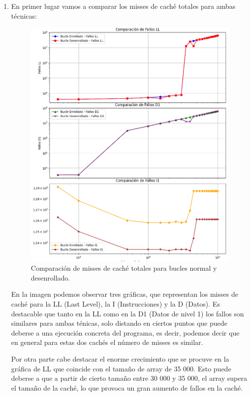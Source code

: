 \documentclass[a4paper,twocolumn]{article}
\begin{document}
\begin{enumerate}
    \item En primer lugar vamos a comparar los misses de caché totales para ambas técnicas:
    \begin{figure}[H]
        \centering
        \includegraphics[width=\columnwidth]{img/numberMisses.png}
        \caption{Comparación de misses de caché totales para bucles normal y desenrollado.}
        \label{fig:real_vs_cpu_time}
    \end{figure}
    
    En la imagen podemos observar tres gráficas, que representan los misses de caché para la LL (Last Level), la I (Instrucciones) y la D (Datos). Es destacable que tanto en la LL como en la D1 (Datos de nivel 1) los fallos son similares para ambas ténicas, solo distando en ciertos puntos que puede deberse a una ejecución concreta del programa, es decir, podemos decir que en general para estas dos cachés el número de misses es similar.

    Por otra parte cabe destacar el enorme crecimiento que se procuve en la gráfica de LL que coincide con el tamaño de array de 35 000. Esto puede deberse a que a partir de cierto tamaño entre 30 000 y 35 000, el array supera el tamaño de la caché, lo que provoca un gran aumento de fallos en la caché. 


\end{enumerate}
\end{document}
